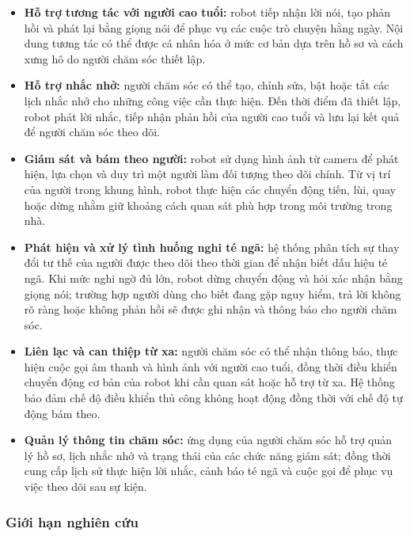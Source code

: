 \begin{itemize}
    \item \textbf{Hỗ trợ tương tác với người cao tuổi:} robot tiếp nhận lời nói, tạo phản hồi và phát lại bằng giọng nói để phục vụ các cuộc trò chuyện hằng ngày. Nội dung tương tác có thể được cá nhân hóa ở mức cơ bản dựa trên hồ sơ và cách xưng hô do người chăm sóc thiết lập.

    \item \textbf{Hỗ trợ nhắc nhở:} người chăm sóc có thể tạo, chỉnh sửa, bật hoặc tắt các lịch nhắc nhở cho những công việc cần thực hiện. Đến thời điểm đã thiết lập, robot phát lời nhắc, tiếp nhận phản hồi của người cao tuổi và lưu lại kết quả để người chăm sóc theo dõi.

    \item \textbf{Giám sát và bám theo người:} robot sử dụng hình ảnh từ camera để phát hiện, lựa chọn và duy trì một người làm đối tượng theo dõi chính. Từ vị trí của người trong khung hình, robot thực hiện các chuyển động tiến, lùi, quay hoặc dừng nhằm giữ khoảng cách quan sát phù hợp trong môi trường trong nhà.

    \item \textbf{Phát hiện và xử lý tình huống nghi té ngã:} hệ thống phân tích sự thay đổi tư thế của người được theo dõi theo thời gian để nhận biết dấu hiệu té ngã. Khi mức nghi ngờ đủ lớn, robot dừng chuyển động và hỏi xác nhận bằng giọng nói; trường hợp người dùng cho biết đang gặp nguy hiểm, trả lời không rõ ràng hoặc không phản hồi sẽ được ghi nhận và thông báo cho người chăm sóc.

    \item \textbf{Liên lạc và can thiệp từ xa:} người chăm sóc có thể nhận thông báo, thực hiện cuộc gọi âm thanh và hình ảnh với người cao tuổi, đồng thời điều khiển chuyển động cơ bản của robot khi cần quan sát hoặc hỗ trợ từ xa. Hệ thống bảo đảm chế độ điều khiển thủ công không hoạt động đồng thời với chế độ tự động bám theo.

    \item \textbf{Quản lý thông tin chăm sóc:} ứng dụng của người chăm sóc hỗ trợ quản lý hồ sơ, lịch nhắc nhở và trạng thái của các chức năng giám sát; đồng thời cung cấp lịch sử thực hiện lời nhắc, cảnh báo té ngã và cuộc gọi để phục vụ việc theo dõi sau sự kiện.
\end{itemize}

\subsubsection{Giới hạn nghiên cứu}

